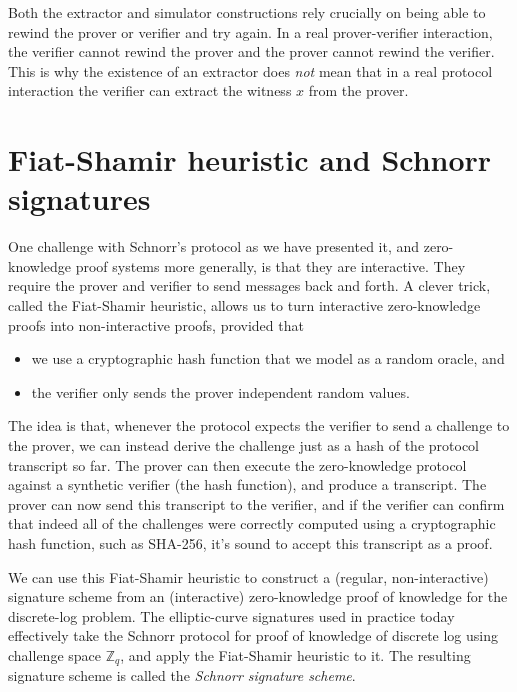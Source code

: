 \documentclass[
  letterpaper,
]{scrbook}
\newcommand{\Z}{\mathbb{Z}}
\theoremstyle{definition}
\theoremstyle{plain}
\theoremstyle{plain}
\theoremstyle{remark}
\begin{document}
Both the extractor and simulator constructions rely crucially on being
able to rewind the prover or verifier and try again. In a real
prover-verifier interaction, the verifier cannot rewind the prover and
the prover cannot rewind the verifier. This is why the existence of an
extractor does \emph{not} mean that in a real protocol interaction the
verifier can extract the witness \(x\) from the prover.

\section{Fiat-Shamir heuristic and Schnorr signatures}\label{sec-hvzk}

One challenge with Schnorr's protocol as we have presented it, and
zero-knowledge proof systems more generally, is that they are
interactive. They require the prover and verifier to send messages back
and forth. A clever trick, called the Fiat-Shamir heuristic, allows us
to turn interactive zero-knowledge proofs into non-interactive proofs,
provided that

\begin{itemize}
\item
  we use a cryptographic hash function that we model as a random oracle,
  and
\item
  the verifier only sends the prover independent random values.

\end{itemize}

The idea is that, whenever the protocol expects the verifier to send a
challenge to the prover, we can instead derive the challenge just as a
hash of the protocol transcript so far. The prover can then execute the
zero-knowledge protocol against a synthetic verifier (the hash
function), and produce a transcript. The prover can now send this
transcript to the verifier, and if the verifier can confirm that indeed
all of the challenges were correctly computed using a cryptographic hash
function, such as SHA-256, it's sound to accept this transcript as a
proof.

We can use this Fiat-Shamir heuristic to construct a (regular,
non-interactive) signature scheme from an (interactive) zero-knowledge
proof of knowledge for the discrete-log problem. The elliptic-curve
signatures used in practice today effectively take the Schnorr protocol
for proof of knowledge of discrete log using challenge space \(\Z_q\),
and apply the Fiat-Shamir heuristic to it. The resulting signature
scheme is called the \emph{Schnorr signature scheme}.
\end{document}
